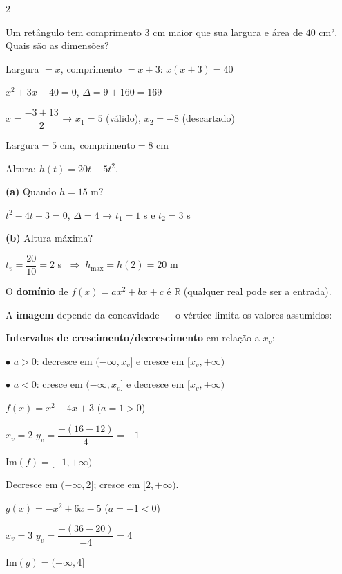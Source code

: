 \documentclass[12pt]{article}
\begin{document}
\begin{multicols}{2}


Um retângulo tem comprimento $3$ cm maior que sua largura e área de $40$ cm².
Quais são as dimensões?

Largura $= x$, comprimento $= x+3$: $x(x+3) = 40$

$x^2 + 3x - 40 = 0$, \; $\Delta = 9 + 160 = 169$

$x = \dfrac{-3 \pm 13}{2}$ → $x_1 = 5$ (válido), $x_2 = -8$ (descartado)

$\boxed{\text{Largura} = 5\text{ cm}, \text{ comprimento} = 8\text{ cm}}$


Altura: $h(t) = 20t - 5t^2$.

\textbf{(a)} Quando $h = 15$ m?\vspace{4pt}

$t^2 - 4t + 3 = 0$, $\Delta = 4$ → $t_1 = 1$ s e $t_2 = 3$ s

\textbf{(b)} Altura máxima?\vspace{4pt}

$t_v = \dfrac{20}{10} = 2$ s $\;\Rightarrow\; \boxed{h_{\max} = h(2) = 20\text{ m}}$


O \textbf{domínio} de $f(x) = ax^2+bx+c$ é $\mathbb{R}$ (qualquer real pode ser a entrada).

A \textbf{imagem} depende da concavidade — o vértice limita os valores assumidos:


\textbf{Intervalos de crescimento/decrescimento} em relação a $x_v$:

$\bullet$ $a > 0$: decresce em $(-\infty, x_v]$ e cresce em $[x_v, +\infty)$

$\bullet$ $a < 0$: cresce em $(-\infty, x_v]$ e decresce em $[x_v, +\infty)$

 $f(x) = x^2 - 4x + 3$ \quad ($a = 1 > 0$)

$x_v = 2$ \hfill $y_v = \dfrac{-(16-12)}{4} = -1$

$\text{Im}(f) = [-1, +\infty)$

Decresce em $(-\infty, 2]$; cresce em $[2, +\infty)$.

 $g(x) = -x^2 + 6x - 5$ \quad ($a = -1 < 0$)

$x_v = 3$ \hfill $y_v = \dfrac{-(36-20)}{-4} = 4$

$\text{Im}(g) = (-\infty, 4]$

\end{multicols}


\end{document}
